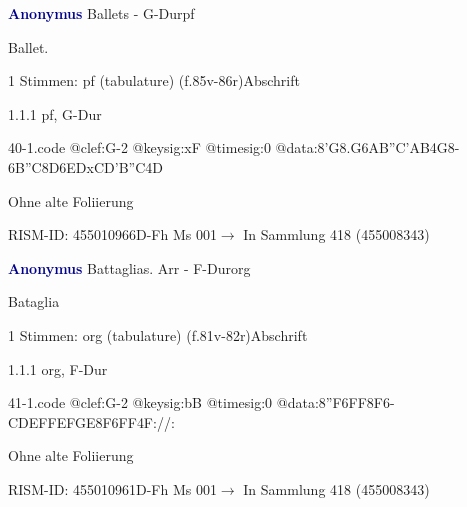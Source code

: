 \documentclass[twocolumn]{book}
\begin{document}
\par \vspace{7pt} \textcolor{darkblue}{\textbf{Anonymus  }}\hfillplus{\textbf{[40]}}\newline Ballets - G-Dur\newline pf
\par \begin{itshape}[f.85v, at left:] Ballet.\end{itshape} 
\par \textcolor{darkblue}{}  1 Stimmen: pf (tabulature)  (f.85v-86r)\newline Abschrift
\par 1.1.1  pf, G-Dur  
\begin{filecontents*}{40-1.code}
@clef:G-2
@keysig:xF
@timesig:0
@data:8'G{8.G6A}{B''C'AB}4G8-{6B''C}{8D6ED}{xCD'B''C}4D
\end{filecontents*}
\newline
%
\par Ohne alte Foliierung
\par RISM-ID: 455010966\newline D-Fh  Ms 001\newline $\rightarrow$ In Sammlung 418 (455008343)
      
\par \vspace{7pt} \textcolor{darkblue}{\textbf{Anonymus  }}\hfillplus{\textbf{[41]}}\newline Battaglias. Arr - F-Dur\newline org
\par \begin{itshape}[f.81v, at left:] Bataglia\end{itshape} 
\par \textcolor{darkblue}{}  1 Stimmen: org (tabulature)  (f.81v-82r)\newline Abschrift
\par 1.1.1  org, F-Dur  
\begin{filecontents*}{41-1.code}
@clef:G-2
@keysig:bB
@timesig:0
@data:{8''F6FF}8F6-C{DEFF}{EFGE}{8F6FF}4F://:
\end{filecontents*}
\newline
%
\par Ohne alte Foliierung
\par RISM-ID: 455010961\newline D-Fh  Ms 001\newline $\rightarrow$ In Sammlung 418 (455008343)
      
\end{document}
